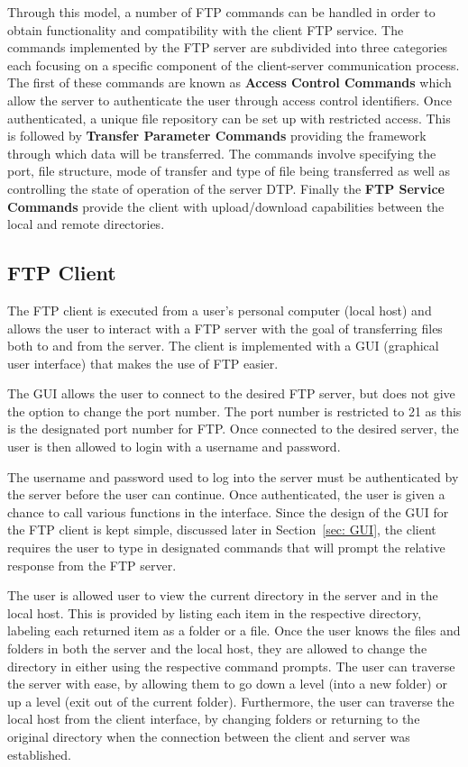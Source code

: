 \documentclass[10pt, conference]{IEEEtran}
\begin{document}
Through this model, a number of FTP commands can be handled in order to obtain functionality and compatibility with the client FTP service. The commands implemented by the FTP server are subdivided into three categories each focusing on a specific component of the client-server communication process\cite{RFC959}. The first of these commands are known as \textbf{Access Control Commands} which allow the server to authenticate the user through access control identifiers. Once authenticated, a unique file repository can be set up with restricted access. This is followed by \textbf{Transfer Parameter Commands} providing the framework through which data will be transferred. The commands involve specifying the port, file structure, mode of transfer and type of file being transferred as well as controlling the state of operation of the server DTP. Finally the \textbf{FTP Service Commands} provide the client with upload/download capabilities between the local and remote directories.

\subsection{FTP Client}
\label{sec: FTP Client}
The FTP client is executed from a user's personal computer (local host) and allows the user to interact with a FTP server with the goal of transferring files both to and from the server. The client is implemented with a GUI (graphical user interface) that makes the use of FTP easier.

The GUI allows the user to connect to the desired FTP server, but does not give the option to change the port number. The port number is restricted to 21 as this is the designated port number for FTP. Once connected to the desired server, the user is then allowed to login with a username and password.

The username and password used to log into the server must be authenticated by the server before the user can continue. Once authenticated, the user is given a chance to call various functions in the interface. Since the design of the GUI for the FTP client is kept simple, discussed later in Section~\ref{sec: GUI}, the client requires the user to type in designated commands that will prompt the relative response from the FTP server.

The user is allowed user to view the current directory in the server and in the local host. This is provided by listing each item in the respective directory, labeling each returned item as a folder or a file. Once the user knows the files and folders in both the server and the local host, they are allowed to change the directory in either using the respective command prompts. The user can traverse the server with ease, by allowing them to go down a level (into a new folder) or up a level (exit out of the current folder). Furthermore, the user can traverse the local host from the client interface, by changing folders or returning to the original directory when the connection between the client and server was established.
\end{document}
